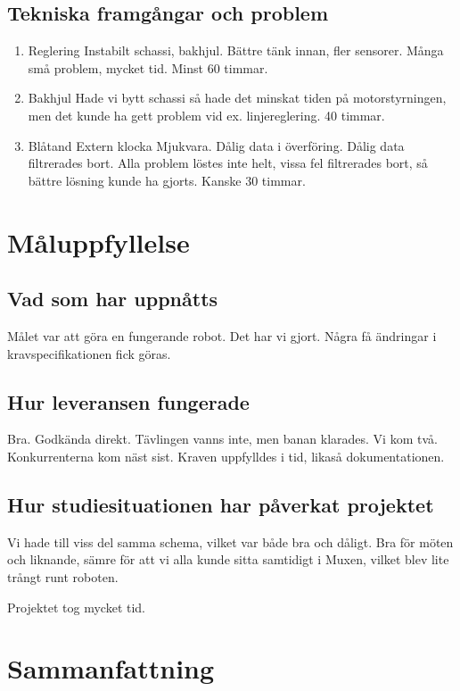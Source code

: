\documentclass[a4paper,12pt]{article}
\begin{document}
\subsection{Tekniska framgångar och problem}

\begin{enumerate}
\item Reglering
Instabilt schassi, bakhjul. 
Bättre tänk innan, fler sensorer.
Många små problem, mycket tid. Minst 60 timmar. 

\item Bakhjul
Hade vi bytt schassi så hade det minskat tiden på motorstyrningen, men det kunde ha gett problem vid ex. linjereglering. 
40 timmar. 

\item Blåtand 
Extern klocka
Mjukvara. 
Dålig data i överföring. Dålig data filtrerades bort. 
Alla problem löstes inte helt, vissa fel filtrerades bort, så bättre lösning kunde ha gjorts. 
Kanske 30 timmar. 
\end{enumerate}

\section{Måluppfyllelse}
\subsection{Vad som har uppnåtts}
Målet var att göra en fungerande robot. Det har vi gjort. Några få ändringar i kravspecifikationen fick göras. 

\subsection{Hur leveransen fungerade}
Bra. Godkända direkt. Tävlingen vanns inte, men banan klarades. Vi kom två. Konkurrenterna kom näst sist. Kraven 
uppfylldes i tid, likaså dokumentationen.  

\subsection{Hur studiesituationen har påverkat projektet}
Vi hade till viss del samma schema, vilket var både bra och dåligt. Bra för möten och liknande, sämre för att vi alla 
kunde sitta samtidigt i Muxen, vilket blev lite trångt runt roboten. 

Projektet tog mycket tid. 

\section{Sammanfattning}
\end{document}
